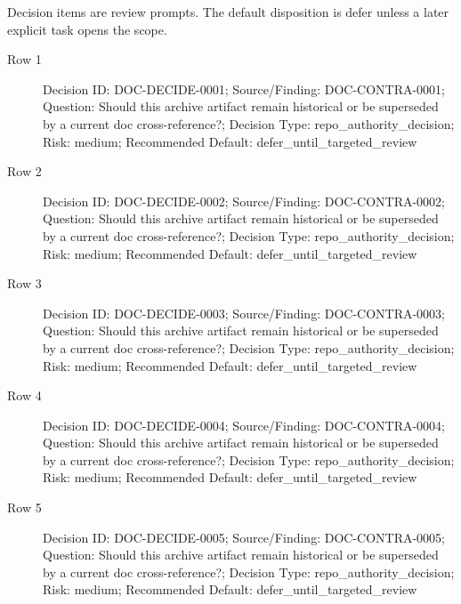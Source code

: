 \documentclass[9pt,a4paper,openany]{book}
\begin{document}
Decision items are review prompts.\allowbreak{} The default disposition is defer unless a later explicit task opens the scope.\allowbreak{}


\begin{description}
\item[Row 1] Decision ID: DOC-\allowbreak{}DECIDE-\allowbreak{}0001; Source/\allowbreak{}Finding: DOC-\allowbreak{}CONTRA-\allowbreak{}0001; Question: Should this archive artifact remain historical or be superseded by a current doc cross-\allowbreak{}reference?; Decision Type: repo\_\allowbreak{}authority\_\allowbreak{}decision; Risk: medium; Recommended Default: defer\_\allowbreak{}until\_\allowbreak{}targeted\_\allowbreak{}review
\item[Row 2] Decision ID: DOC-\allowbreak{}DECIDE-\allowbreak{}0002; Source/\allowbreak{}Finding: DOC-\allowbreak{}CONTRA-\allowbreak{}0002; Question: Should this archive artifact remain historical or be superseded by a current doc cross-\allowbreak{}reference?; Decision Type: repo\_\allowbreak{}authority\_\allowbreak{}decision; Risk: medium; Recommended Default: defer\_\allowbreak{}until\_\allowbreak{}targeted\_\allowbreak{}review
\item[Row 3] Decision ID: DOC-\allowbreak{}DECIDE-\allowbreak{}0003; Source/\allowbreak{}Finding: DOC-\allowbreak{}CONTRA-\allowbreak{}0003; Question: Should this archive artifact remain historical or be superseded by a current doc cross-\allowbreak{}reference?; Decision Type: repo\_\allowbreak{}authority\_\allowbreak{}decision; Risk: medium; Recommended Default: defer\_\allowbreak{}until\_\allowbreak{}targeted\_\allowbreak{}review
\item[Row 4] Decision ID: DOC-\allowbreak{}DECIDE-\allowbreak{}0004; Source/\allowbreak{}Finding: DOC-\allowbreak{}CONTRA-\allowbreak{}0004; Question: Should this archive artifact remain historical or be superseded by a current doc cross-\allowbreak{}reference?; Decision Type: repo\_\allowbreak{}authority\_\allowbreak{}decision; Risk: medium; Recommended Default: defer\_\allowbreak{}until\_\allowbreak{}targeted\_\allowbreak{}review
\item[Row 5] Decision ID: DOC-\allowbreak{}DECIDE-\allowbreak{}0005; Source/\allowbreak{}Finding: DOC-\allowbreak{}CONTRA-\allowbreak{}0005; Question: Should this archive artifact remain historical or be superseded by a current doc cross-\allowbreak{}reference?; Decision Type: repo\_\allowbreak{}authority\_\allowbreak{}decision; Risk: medium; Recommended Default: defer\_\allowbreak{}until\_\allowbreak{}targeted\_\allowbreak{}review

\end{description}
\end{document}
